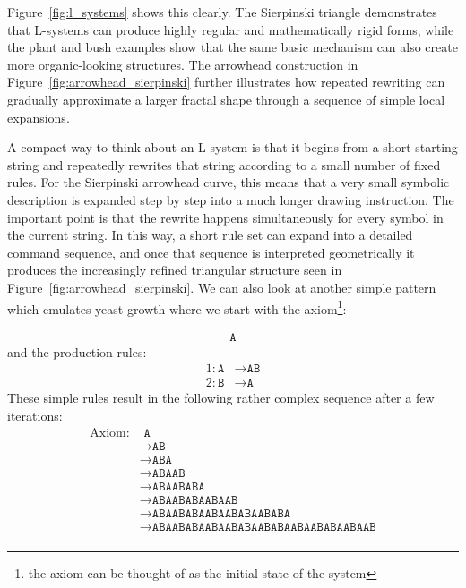   Figure~\ref{fig:l_systems} shows this clearly. The Sierpinski triangle demonstrates that L-systems can produce highly regular and mathematically rigid forms, while the plant and bush examples show that the same basic mechanism can also create more organic-looking structures. The arrowhead construction in Figure~\ref{fig:arrowhead_sierpinski} further illustrates how repeated rewriting can gradually approximate a larger fractal shape through a sequence of simple local expansions.

  A compact way to think about an L-system is that it begins from a short starting string and repeatedly rewrites that string according to a small number of fixed rules. For the Sierpinski arrowhead curve, this means that a very small symbolic description is expanded step by step into a much longer drawing instruction. The important point is that the rewrite happens simultaneously for every symbol in the current string. In this way, a short rule set can expand into a detailed command sequence, and once that sequence is interpreted geometrically it produces the increasingly refined triangular structure seen in Figure~\ref{fig:arrowhead_sierpinski}. We can also look at another simple pattern which emulates yeast growth where we start with the axiom\footnote{the axiom can be thought of as the initial state of the system}:

  \begin{align*}
    \texttt{A}
  \end{align*}
  and the production rules:
  \begin{align*}
    1: \texttt{A} &\to \texttt{AB} \\
    2: \texttt{B} &\to \texttt{A}
  \end{align*}
  These simple rules result in the following rather complex sequence after a few iterations:
  \begin{align*}
    \text{Axiom:}& \texttt{ A} \\
    &\to \texttt{AB} \\
    &\to \texttt{ABA} \\
    &\to \texttt{ABAAB} \\
    &\to \texttt{ABAABABA} \\
    &\to \texttt{ABAABABAABAAB} \\
    &\to \texttt{ABAABABAABAABABAABABA} \\
    &\to \texttt{ABAABABAABAABABAABABAABAABABAABAAB} \\
  \end{align*}


